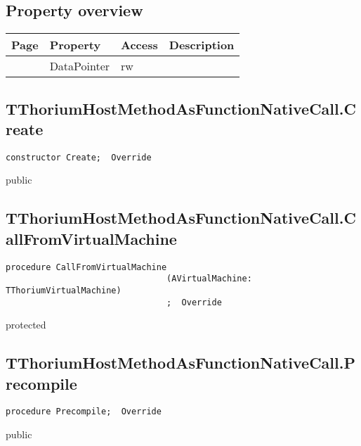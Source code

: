 \subsection{Property overview}
\label{thoriumcore:thorium:tthoriumhostmethodasfunctionnativecall:properties}
\begin{tabularx}{\textwidth}{lllX}
Page & Property & Access & Description \\ \hline
\pageref{thoriumcore:thorium:tthoriumhostmethodasfunctionnativecall:datapointer} & DataPointer & rw &  \\
\hline
\end{tabularx}
\subsection{TThoriumHostMethodAsFunctionNativeCall.Create}
\label{thoriumcore:thorium:tthoriumhostmethodasfunctionnativecall:create}
\begin{FPCList}
\Synopsis
\Declaration 

\begin{verbatim}
constructor Create;  Override
\end{verbatim}
\Visibility
public
\Description
\Errors
\end{FPCList}
\subsection{TThoriumHostMethodAsFunctionNativeCall.CallFromVirtualMachine}
\label{thoriumcore:thorium:tthoriumhostmethodasfunctionnativecall:callfromvirtualmachine}
\begin{FPCList}
\Synopsis
\Declaration 

\begin{verbatim}
procedure CallFromVirtualMachine
                                (AVirtualMachine: TThoriumVirtualMachine)
                                ;  Override
\end{verbatim}
\Visibility
protected
\Description
\Errors
\end{FPCList}
\subsection{TThoriumHostMethodAsFunctionNativeCall.Precompile}
\label{thoriumcore:thorium:tthoriumhostmethodasfunctionnativecall:precompile}
\begin{FPCList}
\Synopsis
\Declaration 

\begin{verbatim}
procedure Precompile;  Override
\end{verbatim}
\Visibility
public
\Description
\Errors
\end{FPCList}
